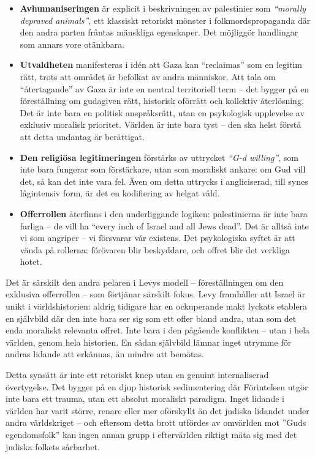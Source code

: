 \documentclass[12pt]{article}
\begin{document}
\begin{itemize}
    \item \textbf{Avhumaniseringen} är explicit i beskrivningen av palestinier som \textit{“morally depraved animals”}, ett klassiskt retoriskt mönster i folkmordspropaganda där den andra parten fråntas mänskliga egenskaper. Det möjliggör handlingar som annars vore otänkbara.
    
    \item \textbf{Utvaldheten} manifesteras i idén att Gaza kan “reclaimas” som en legitim rätt, trots att området är befolkat av andra människor. Att tala om “återtagande” av Gaza är inte en neutral territoriell term – det bygger på en föreställning om gudagiven rätt, historisk oförrätt och kollektiv återlösning. Det är inte bara en politisk anspråksrätt, utan en psykologisk upplevelse av exklusiv moralisk prioritet. Världen är inte bara tyst – den ska helst förstå att detta undantag är berättigat.

    \item \textbf{Den religiösa legitimeringen} förstärks av uttrycket \textit{“G-d willing”}, som inte bara fungerar som förstärkare, utan som moraliskt ankare: om Gud vill det, så kan det inte vara fel. Även om detta uttrycks i angliciserad, till synes lågintensiv form, är det en kodifiering av helgat våld.

    \item \textbf{Offerrollen} återfinns i den underliggande logiken: palestinierna är inte bara farliga – de vill ha “every inch of Israel and all Jews dead”. Det är alltså inte vi som angriper – vi försvarar vår existens. Det psykologiska syftet är att vända på rollerna: förövaren blir beskyddare, och offret blir det verkliga hotet.
\end{itemize}

Det är särskilt den andra pelaren i Levys modell – föreställningen om den exklusiva offerrollen – som förtjänar särskilt fokus. Levy framhåller att Israel är unikt i världshistorien: aldrig tidigare har en ockuperande makt lyckats etablera en självbild där den inte bara ser sig som ett offer bland andra, utan som det enda moraliskt relevanta offret. Inte bara i den pågående konflikten – utan i hela världen, genom hela historien. En sådan självbild lämnar inget utrymme för andras lidande att erkännas, än mindre att bemötas.


Detta synsätt är inte ett retoriskt knep utan en genuint internaliserad övertygelse. Det bygger på en djup historisk sedimentering där Förintelsen utgör inte bara ett trauma, utan ett absolut moraliskt paradigm. Inget lidande i världen har varit större, renare eller mer oförskyllt än det judiska lidandet under andra världskriget – och eftersom detta brott utfördes av omvärlden mot ”Guds egendomsfolk” kan ingen annan grupp i eftervärlden riktigt mäta sig med det judiska folkets sårbarhet. 
\end{document}
